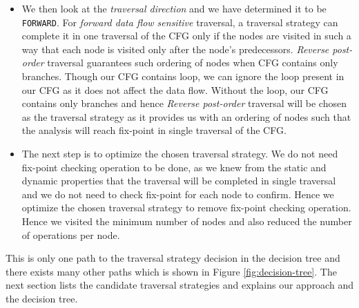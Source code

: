 \begin{itemize}
\item We then look at the \textit{traversal direction} and we have determined it to be \texttt{FORWARD}. For \textit{forward data flow sensitive} traversal, a traversal strategy can complete it in one traversal of the CFG only if the nodes are visited in such a way that each node is visited only after the node's predecessors. \textit{Reverse post-order} traversal guarantees such ordering of  nodes when CFG contains only branches. Though our CFG contains loop, we can ignore the loop present in our CFG as it does not affect the data flow. Without the loop, our CFG contains only branches and hence \textit{Reverse post-order} traversal will be chosen as the traversal strategy as it provides us with an ordering of nodes such that the analysis will reach fix-point in single traversal of the CFG.
\item The next step is to optimize the chosen traversal strategy. We do not need fix-point checking operation to be done, as we knew from the static and dynamic properties that the traversal will be completed in single traversal and we do not need to check fix-point for each node to confirm. Hence we optimize the chosen traversal strategy to remove fix-point checking operation. Hence we visited the minimum number of nodes and also reduced the number of operations per node.
\end{itemize}
This is only one path to the traversal strategy decision in the decision tree and there exists many other paths which is shown in Figure \ref{fig:decision-tree}. The next section lists the candidate traversal strategies and explains our approach and the decision tree.